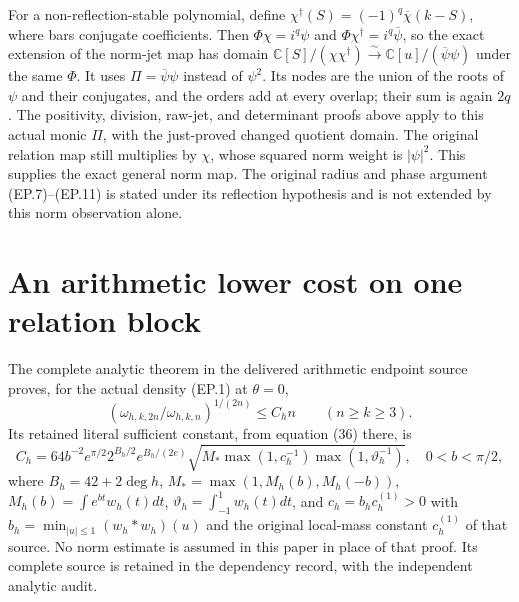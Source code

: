 \documentclass[11pt]{article}
\newcommand{\C}{\mathbb C}\newcommand{\R}{\mathbb R}
\begin{document}
For a non-reflection-stable polynomial, define
$\chi^\dagger(S)=(-1)^q\overline\chi(k-S)$, where bars conjugate
coefficients. Then $\Phi\chi=i^q\psi$ and
$\Phi\chi^\dagger=i^q\overline\psi$, so the exact extension of the
norm-jet map has domain
$\C[S]/(\chi\chi^\dagger)\xrightarrow{\sim}
\C[u]/(\overline\psi\psi)$ under the same $\Phi$.
It uses $\Pi=\overline\psi\psi$ instead of $\psi^2$. Its nodes are the
union of the roots of $\psi$ and their conjugates, and the orders
add at every overlap; their sum is again $2q$. The positivity,
division, raw-jet, and determinant proofs above apply to this actual
monic $\Pi$, with the just-proved changed quotient domain. The original
relation map still multiplies by $\chi$, whose squared norm weight
is $|\psi|^2$. This supplies the exact general norm
map. The original radius and phase argument (EP.7)--(EP.11) is
stated under its reflection hypothesis and is not extended by this
norm observation alone.

\section{An arithmetic lower cost on one relation block}
The complete analytic theorem in the delivered arithmetic endpoint
source proves, for the actual density (EP.1) at $\theta=0$,
\[
 \left(\omega_{h,k,2n}/\omega_{h,k,n}\right)^{1/(2n)}
 \le C_h n\qquad(n\ge k\ge3).\tag{EP.39}
\]
Its retained literal sufficient constant, from equation (36) there, is
\[
 C_h=64b^{-2}e^{\pi/2}2^{B_h/2}e^{B_h/(2e)}
 \sqrt{M_*\max(1,c_h^{-1})\max(1,\vartheta_h^{-1})},
 \quad 0<b<\pi/2,\tag{EP.40}
\]
where $B_h=42+2\deg h$, $M_*=\max(1,M_h(b),M_h(-b))$,
$M_h(b)=\int e^{bt}w_h(t)dt$,
$\vartheta_h=\int_{-1}^1w_h(t)dt$, and
$c_h=b_hc_h^{(1)}>0$ with
$b_h=\min_{|u|\le1}(w_h*w_h)(u)$ and the original local-mass
constant $c_h^{(1)}$ of that source. No norm estimate is assumed
in this paper in place of that proof. Its complete source is retained
in the dependency record, with the independent analytic audit.
\end{document}
